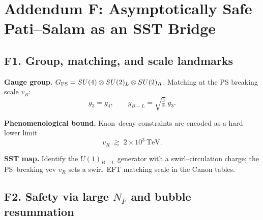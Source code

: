 \documentclass[11pt]{article}
\begin{document}
  \titlepageOpen

  \begin{abstract}


  \end{abstract}

  \titlepageClose
  \fi

  \ifdefined\standalonechapter
  \section{\papertitle}
  \else
  \fi


  \section*{Addendum F: Asymptotically Safe Pati–Salam as an SST Bridge}

      \subsection*{F1. Group, matching, and scale landmarks}

          \textbf{Gauge group.} \; $G_{\rm PS}=SU(4)\otimes SU(2)_L\otimes SU(2)_R$.
          Matching at the PS breaking scale $v_R$:
          \begin{equation}
          g_3=g_4,\qquad
          g_{B-L}=\sqrt{\tfrac{3}{8}}\;g_3.
          \end{equation}

          \textbf{Phenomenological bound.} \; Kaon–decay constraints are encoded as a hard lower limit
          \begin{equation}
          v_R \;\gtrsim\; 2\times10^{3}\ \text{TeV}.
          \end{equation}

          \textbf{SST map.} \; Identify the $U(1)_{B-L}$ generator with a swirl–circulation charge; the PS–breaking vev $v_R$ sets a swirl–EFT matching scale in the Canon tables.

      \subsection*{F2. Safety via large $N_F$ and bubble resummation}
\end{document}
